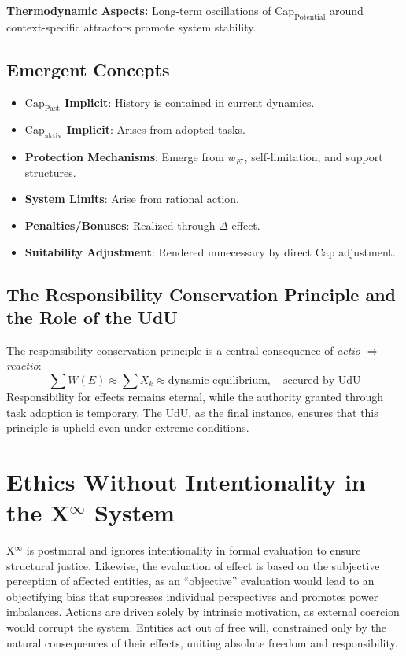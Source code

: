 \documentclass[12pt]{scrartcl}
\begin{document}
\textbf{Thermodynamic Aspects:}
Long-term oscillations of $\text{Cap}_{\text{Potential}}$ around context-specific attractors promote system stability.

\subsection{Emergent Concepts}
\begin{itemize}
    \item \textbf{\(\text{Cap}_{\text{Past}}\) Implicit}: History is contained in current dynamics.
    \item \textbf{\(\text{Cap}_{\text{aktiv}}\) Implicit}: Arises from adopted tasks.
    \item \textbf{Protection Mechanisms}: Emerge from $w_{E'}$, self-limitation, and support structures.
    \item \textbf{System Limits}: Arise from rational action.
    \item \textbf{Penalties/Bonuses}: Realized through $\Delta$-effect.
    \item \textbf{Suitability Adjustment}: Rendered unnecessary by direct Cap adjustment.
\end{itemize}

\subsection{The Responsibility Conservation Principle and the Role of the UdU}
\label{sec:CapErhaltung}
The responsibility conservation principle is a central consequence of \emph{actio $\Rightarrow$ reactio}:
\begin{equation}
\sum W(E) \approx \sum X_k \approx \text{dynamic equilibrium}, \quad \text{secured by UdU}
\label{eq:VerantwortungErhaltungFinal}
\end{equation}
Responsibility for effects remains eternal, while the authority granted through task adoption is temporary. The UdU, as the final instance, ensures that this principle is upheld even under extreme conditions.

\section{Ethics Without Intentionality in the X$^\infty$ System}
\label{sec:EthikOhneIntentionalitaet}

X$^\infty$ is postmoral and ignores intentionality in formal evaluation to ensure structural justice. Likewise, the evaluation of effect is based on the subjective perception of affected entities, as an “objective” evaluation would lead to an objectifying bias that suppresses individual perspectives and promotes power imbalances. Actions are driven solely by intrinsic motivation, as external coercion would corrupt the system. Entities act out of free will, constrained only by the natural consequences of their effects, uniting absolute freedom and responsibility.
\end{document}
